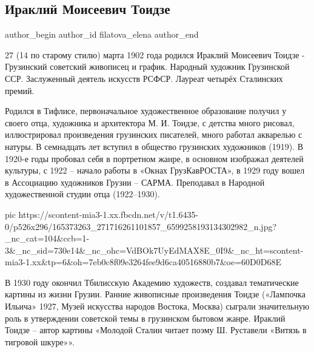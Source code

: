  
 
 
 
 
 
\subsection{Ираклий Моисеевич Тоидзе}
\label{sec:27_03_2021.fb.filatova_elena.1.iraklij_toidze}
\ifcmt
 author_begin
   author_id filatova_elena
 author_end
\fi

27 (14 по старому стилю) марта 1902 года родился Ираклий Моисеевич Тоидзе -
Грузинский советский живописец и график. Народный художник Грузинской ССР.
Заслуженный деятель искусств РСФСР. Лауреат четырёх Сталинских премий.

Родился в Тифлисе, первоначальное художественное образование получил у своего
отца, художника и архитектора М. И. Тоидзе, с детства много рисовал,
иллюстрировал произведения грузинских писателей, много работал акварелью с
натуры. В семнадцать лет вступил в общество грузинских художников (1919). В
1920-е годы пробовал себя в портретном жанре, в основном изображал деятелей
культуры, с 1922 – начало работы в «Окнах ГрузКавРОСТА», в 1929 году вошел в
Ассоциацию художников Грузии – САРМА. Преподавал в Народной художественной
студии отца (1922–1930).

\ifcmt
  pic https://scontent-mia3-1.xx.fbcdn.net/v/t1.6435-0/p526x296/165373263_271716261101857_6599258193134302982_n.jpg?_nc_cat=104&ccb=1-3&_nc_sid=730e14&_nc_ohc=VdBOk7UyEdMAX8E_0I9&_nc_ht=scontent-mia3-1.xx&tp=6&oh=7eb0c8f09e3264fee9d6ca40516880b7&oe=60D0D68E
\fi

В 1930 году окончил Тбилисскую Академию художеств, создавал тематические
картины из жизни Грузии. Ранние живописные произведения Тоидзе («Лампочка
Ильича» 1927, Музей искусства народов Востока, Москва) сыграли значительную
роль в утверждении советской темы в грузинском бытовом жанре. Ираклий Тоидзе –
автор картины «Молодой Сталин читает поэму Ш. Руставели «Витязь в тигровой
шкуре»».

